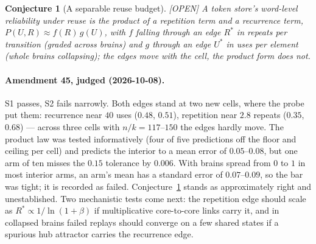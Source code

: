 \documentclass[11pt]{article}
\theoremstyle{definition}
\theoremstyle{plain}
\newtheorem{conjecture}[lemma]{Conjecture}
\newcommand{\OPEN}{\textnormal{\footnotesize\textsf{[OPEN]}}}
\begin{document}
\begin{conjecture}[A separable reuse budget]\label{conj:separable} \OPEN
A token store's word-level reliability under reuse is the product of a
repetition term and a recurrence term, $P(U,R) \approx f(R)\,g(U)$, with $f$
falling through an edge $R^*$ in repeats per transition (graded across brains)
and $g$ through an edge $U^*$ in uses per element (whole brains collapsing);
the edges move with the cell, the product form does not.
\end{conjecture}

\paragraph{Amendment 45, judged (2026-10-08).} S1 passes, S2 fails narrowly.
Both edges stand at two new cells, where the probe put them: recurrence near
$40$ uses ($0.48$, $0.51$), repetition near $2.8$ repeats ($0.35$, $0.68$) --- across
three cells with $n/k = 117$--$150$ the edges hardly move. The product law was
tested informatively (four of five predictions off the floor and ceiling per
cell) and predicts the interior to a mean error of $0.05$--$0.08$, but one arm of
ten misses the $0.15$ tolerance by $0.006$. With brains spread from $0$ to $1$ in
most interior arms, an arm's mean has a standard error of $0.07$--$0.09$, so the
bar was tight; it is recorded as failed. Conjecture~\ref{conj:separable} stands
as approximately right and unestablished. Two mechanistic tests come next: the
repetition edge should scale as $R^* \propto 1/\ln(1+\beta)$ if multiplicative
core-to-core links carry it, and in collapsed brains failed replays should
converge on a few shared states if a spurious hub attractor carries the
recurrence edge.
\end{document}
